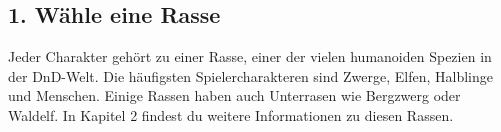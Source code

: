 \subsection{1. Wähle eine Rasse}
Jeder Charakter gehört zu einer Rasse, einer der vielen humanoiden Spezien in der DnD-Welt. Die häufigsten Spielercharakteren sind Zwerge, Elfen, Halblinge und Menschen. Einige Rassen haben auch Unterrasen wie Bergzwerg oder Waldelf. In Kapitel 2 findest du weitere Informationen zu diesen Rassen.

